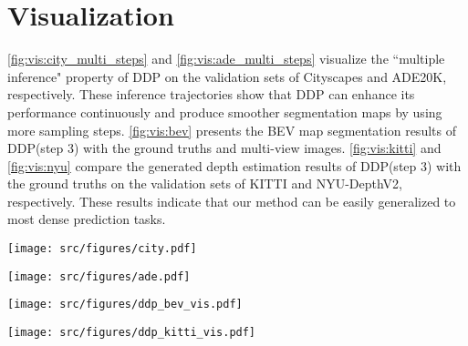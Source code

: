 \documentclass[10pt,twocolumn,letterpaper]{article}
\newcommand{\ours}[0]{DDP\xspace}
\begin{document}
\section{Visualization}
\label{supp:visualization}

\cref{fig:vis:city_multi_steps} and \cref{fig:vis:ade_multi_steps} visualize the ``multiple inference" property of \ours on the validation sets of Cityscapes and ADE20K, respectively.
These inference trajectories show that DDP can enhance its performance continuously and produce smoother segmentation maps by using more sampling steps.
\cref{fig:vis:bev} presents the BEV map segmentation results of \ours (step 3) with the ground truths and multi-view images.
\cref{fig:vis:kitti} and \cref{fig:vis:nyu} compare the generated depth estimation results of \ours (step 3) with the ground truths on the validation sets of KITTI and NYU-DepthV2, respectively. 
These results indicate that our method can be easily generalized to most dense prediction tasks.






\newpage

\begin{figure*}[h]
    \centering
    \texttt{[image: src/figures/city.pdf]}
    \caption{\textbf{Visualization of multiple inference on Cityscapes val set.}
     }
    \label{fig:vis:city_multi_steps}
\end{figure*}

\newpage
\begin{figure*}[h]
    \centering
    \texttt{[image: src/figures/ade.pdf]}
    \caption{\textbf{Visualization of multiple inference on ADE20K val set.}
     }
    \label{fig:vis:ade_multi_steps}
\end{figure*}

\newpage
\begin{figure*}[h]
    \centering
    \texttt{[image: src/figures/ddp\_bev\_vis.pdf]}
    \caption{\textbf{Visualization of predicted BEV map segmentation results on nuScenes val set.}
     }
    \label{fig:vis:bev}
\end{figure*}

\newpage
\begin{figure*}[h]
    \centering
    \texttt{[image: src/figures/ddp\_kitti\_vis.pdf]}
    \caption{\textbf{Visualization of predicted depth estimation results on KITTI val set.}
     }
    \label{fig:vis:kitti}
\end{figure*}
\end{document}
